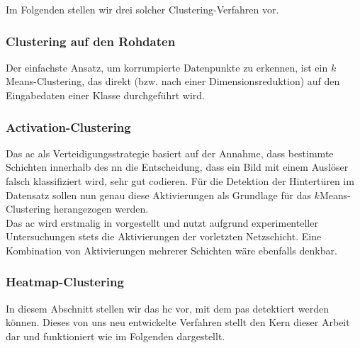 \documentclass[twoside, 12pt,a4paper]{book}
\newtheorem{remark}[theorem]{Bemerkung}
\numberwithin{equation}{section}
\begin{document}
	\noindent Im Folgenden stellen wir drei solcher Clustering-Verfahren vor.
	
	\subsubsection{Clustering auf den Rohdaten}
	Der einfachste Ansatz, um korrumpierte Datenpunkte zu erkennen, ist ein $k$Means-Clustering, das direkt (bzw. nach einer Dimensionsreduktion) auf den Eingabedaten einer Klasse durchgeführt wird. 
	
	\subsubsection{Activation-Clustering}
	
	
	Das \acf{ac} als Verteidigungsstrategie basiert auf der Annahme, dass bestimmte Schichten innerhalb des \ac{nn} die Entscheidung, dass ein Bild mit einem Auslöser falsch klassifiziert wird, sehr gut codieren. Für die Detektion der Hintertüren im Datensatz sollen nun genau diese Aktivierungen als Grundlage für das $k$Means-Clustering herangezogen werden.\\
	Das \ac{ac} wird erstmalig in \cite{AC} vorgestellt und nutzt aufgrund experimenteller Untersuchungen stets die Aktivierungen der vorletzten Netzschicht. Eine Kombination von Aktivierungen mehrerer Schichten wäre ebenfalls denkbar.
	
	

	
	
	

	
	\subsubsection{Heatmap-Clustering} \label{chapter:algorithm}
	In diesem Abschnitt stellen wir das \acf{hc} vor, mit dem \acp{pa} detektiert werden können. Dieses von uns neu entwickelte Verfahren stellt den Kern dieser Arbeit dar und funktioniert wie im Folgenden dargestellt.\\
	
\end{document}
